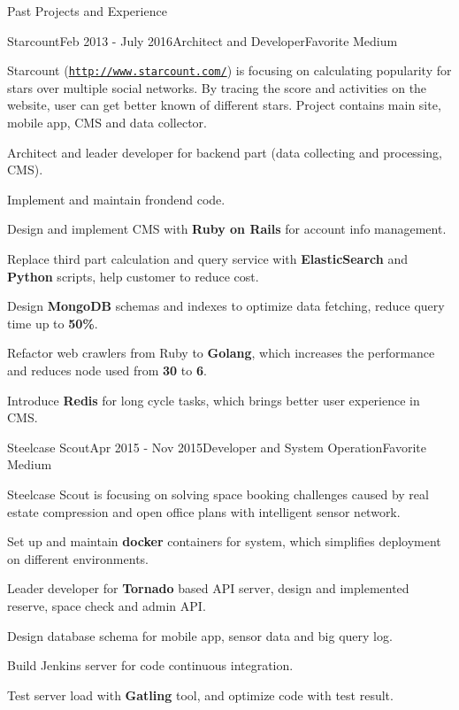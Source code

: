 \documentclass{resume} %
\newcommand{\http}{http:/\hspace{-0.3ex}/}
\begin{document}
\begin{rSection}{Past Projects and Experience}


\begin{rSubsection}{Starcount}{Feb 2013 - July 2016}{Architect and Developer}{Favorite Medium}

Starcount (\href{http://www.starcount.com/}{\tt \http{}www.starcount.com/}) is focusing on calculating popularity for stars over multiple social networks. By tracing the score and activities on the website, user can get better known of different stars. Project contains main site, mobile app, CMS and data collector.

\begin{rSubsectionList}
\item Architect and leader developer for backend part (data collecting and processing, CMS).
\item Implement and maintain frondend code.
\item Design and implement CMS with \textbf{Ruby on Rails} for account info management.
\item Replace third part calculation and query service with \textbf{ElasticSearch} and \textbf{Python} scripts, help customer to reduce cost.
\item Design \textbf{MongoDB} schemas and indexes to optimize data fetching, reduce query time up to \textbf{50\%}.
\item Refactor web crawlers from Ruby to \textbf{Golang}, which increases the performance and reduces node used from \textbf{30} to \textbf{6}.
\item Introduce \textbf{Redis} for long cycle tasks, which brings better user experience in CMS.
\end{rSubsectionList}
\end{rSubsection}


\begin{rSubsection}{Steelcase Scout}{Apr 2015 - Nov 2015}{Developer and System Operation}{Favorite Medium}

Steelcase Scout is focusing on solving space booking challenges caused by real estate compression and open office plans with intelligent sensor network.

\begin{rSubsectionList}
\item Set up and maintain \textbf{docker} containers for system, which simplifies deployment on different environments.
\item Leader developer for \textbf{Tornado} based API server, design and implemented reserve, space check and admin API.
\item Design database schema for mobile app, sensor data and big query log.
\item Build Jenkins server for code continuous integration.
\item Test server load with \textbf{Gatling} tool, and optimize code with test result.
\end{rSubsectionList}
\end{rSubsection}



\end{rSection}
\end{document}
